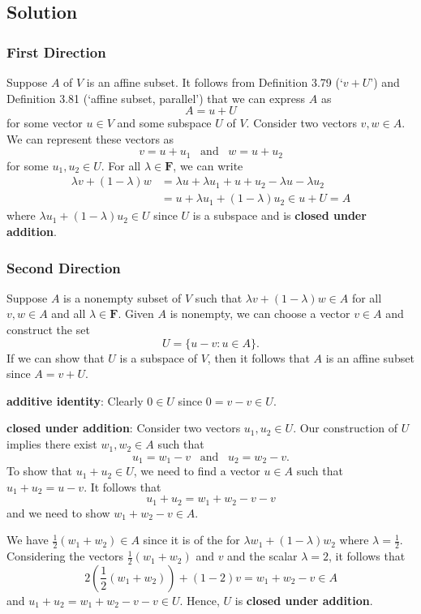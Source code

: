 \documentclass{article}
\begin{document}
\subsection*{Solution}
\subsubsection*{First Direction}
Suppose $A$ of $V$ is an affine subset. 
It follows from Definition 3.79 (`$v+U$') and Definition 3.81 (`affine subset, parallel') that we can express $A$ as 
\[A=u+U\]
for some vector $u\in V$ and some subspace $U$ of $V$. 
Consider two vectors $v,w\in A$. 
We can represent these vectors as 
\[v=u+u_1\;\;\;\text{and}\;\;\;w=u+u_2\]
for some $u_1,u_2\in U$. 
For all $\lambda\in\mathbf{F}$, we can write
\begin{align*}
    \lambda v+(1-\lambda)w &= \lambda u+\lambda u_1+u+u_2-\lambda u -\lambda u_2\\
    &= u+\lambda u_1+(1-\lambda)u_2\in u+U=A
\end{align*}
where $\lambda u_1+(1-\lambda)u_2\in U$ since $U$ is a subspace and is \textbf{closed under addition}.

\subsubsection*{Second Direction}
Suppose $A$ is a nonempty subset of $V$ such that $\lambda v+(1-\lambda)w\in A$ for all $v,w\in A$ and all $\lambda\in\mathbf{F}$. 
Given $A$ is nonempty, we can choose a vector $v\in A$ and construct the set
\[U=\{u-v:u\in A\}.\]
If we can show that $U$ is a subspace of $V$, then it follows that $A$ is an affine subset since $A=v+U$.

\textbf{additive identity}: Clearly $0\in U$ since $0=v-v\in U$.

\textbf{closed under addition}: Consider two vectors $u_1,u_2\in U$. 
Our construction of $U$ implies there exist $w_1,w_2\in A$ such that
\[u_1=w_1-v\;\;\;\text{and}\;\;\;u_2=w_2-v.\]
To show that $u_1+u_2\in U$, we need to find a vector $u\in A$ such \newline that $u_1+u_2=u-v$. 
It follows that
\[u_1+u_2=w_1+w_2-v-v\]
and we need to show $w_1+w_2-v\in A$.

We have $\frac{1}{2}(w_1+w_2)\in A$ since it is of the for $\lambda w_1+(1-\lambda)w_2$ where $\lambda=\frac{1}{2}$. 
Considering the vectors $\frac{1}{2}(w_1+w_2)$ and $v$ and the scalar $\lambda=2$, it follows that
\[2(\frac{1}{2}(w_1+w_2))+(1-2)v=w_1+w_2-v\in A\]
and $u_1+u_2=w_1+w_2-v-v\in U$. 
Hence, $U$ is \textbf{closed under addition}.
\end{document}
